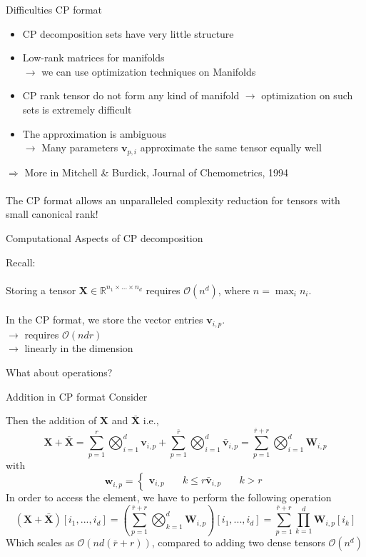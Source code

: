 \documentclass{beamer}
\newcommand{\bvec}[1]{\mathbf{#1}}
\newcommand{\vv}{\bvec{v}}
\newcommand{\vw}{\bvec{w}}
\newcommand{\vW}{\bvec{W}}
\newcommand{\vX}{\bvec{X}}
\newcommand{\bitem}{\item[$\bullet$]}
\begin{document}
\begin{frame}{Difficulties CP format}

\begin{itemize}
\bitem CP decomposition sets have very little structure
\bitem Low-rank matrices for manifolds\\
$\rightarrow$ we can use optimization techniques on Manifolds
\bitem CP rank tensor do not form any kind of manifold 
$\rightarrow$ optimization on such sets is extremely difficult
\bitem The approximation is ambiguous\\
$\rightarrow$ Many parameters $\vv_{p,i}$ approximate the same tensor equally well
\end{itemize}

\begin{center}
$\Rightarrow$ More in Mitchell \& Burdick, Journal of Chemometrics, 1994\\
~\\
The CP format allows an unparalleled complexity reduction for tensors with small canonical rank!
\end{center}

\end{frame}



\begin{frame}{Computational Aspects of CP decomposition}

Recall:\\
~\\
Storing a tensor $\vX \in \mathbb{R}^{n_1\times ... \times n_d}$ requires $\mathcal{O}(n^d)$, where $n = \max_{i} n_i$.\\
\pause
~\\
In the CP format, we store the vector entries $\vv_{i,p}$.\\
$\rightarrow$ requires $\mathcal{O}(ndr)$\\
$\rightarrow$ linearly in the dimension

\begin{center}
What about operations?
\end{center}
\end{frame}

\begin{frame}{Addition in CP format}
Consider 

Then the addition of $\vX$ and $\bar{\vX}$ i.e., 
$$
\vX + \bar{\vX}
=
\sum_{p=1}^r \bigotimes_{i=1}^d \vv_{i,p} 
+
\sum_{p=1}^{\bar{r}} \bigotimes_{i=1}^d \bar{\vv}_{i,p}
=
\sum_{p=1}^{\bar{r} + r} \bigotimes_{i=1}^d
\vW_{i,p}
$$
with 
\begin{equation}
\vw_{i,p}
=
\left\lbrace
\begin{aligned}
\vv_{i,p}\quad & k\leq r
\bar{\vv}_{i,p} \quad & k> r
\end{aligned}
\right.
\end{equation}
In order to access the element, we have to perform the following operation
$$
(\vX + \bar{\vX}) [i_1,...,i_d]
=
\left( 
\sum_{p=1}^{\bar{r} + r} \bigotimes_{k=1}^d
\vW_{i,p} \right) [i_1,...,i_d]
=
\sum_{p=1}^{\bar{r} + r} \prod_{k=1}^d
\vW_{i,p}  [i_k]
$$
Which scales as $\mathcal{O}(nd(\bar{r} + r))$, compared to adding two dense tensors $\mathcal{O}(n^d)$

\end{frame}
\end{document}
